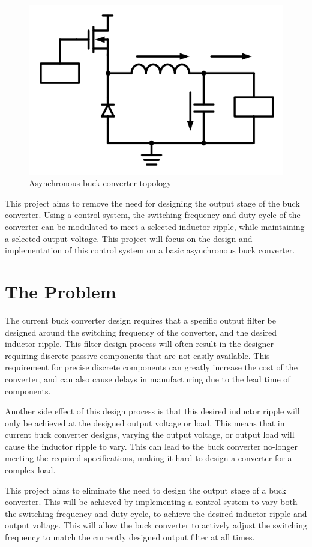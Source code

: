 \documentclass[11pt, a4paper, twoside, openright]{report}
\begin{document}
\begin{figure}[h!]
	\begin{center}
		\includegraphics[width=0.6\linewidth]{asynchronous_buck.png}
		\caption{Asynchronous buck converter topology \cite{BuckTopology}}
		\label{asynchronous_buck}
	\end{center}
\end{figure}

This project aims to remove the need for designing the output stage of the buck converter. Using a control system, the switching frequency and duty cycle of the converter can be modulated to meet a selected inductor ripple, while maintaining a selected output voltage. This project will focus on the design and implementation of this control system on a basic asynchronous buck converter.
\newpage

\section{The Problem}

The current buck converter design requires that a specific output filter be designed around the switching frequency of the converter, and the desired inductor ripple. This filter design process will often result in the designer requiring discrete passive components that are not easily available. This requirement for precise discrete components can greatly increase the cost of the converter, and can also cause delays in manufacturing due to the lead time of components.

Another side effect of this design process is that this desired inductor ripple will only be achieved at the designed output voltage or load. This means that in current buck converter designs, varying the output voltage, or output load will cause the inductor ripple to vary. This can lead to the buck converter no-longer meeting the required specifications, making it hard to design a converter for a complex load.

This project aims to eliminate the need to design the output stage of a buck converter. This will be achieved by implementing a control system to vary both the switching frequency and duty cycle, to achieve the desired inductor ripple and output voltage. This will allow the buck converter to actively adjust the switching frequency to match the currently designed output filter at all times.
\end{document}
